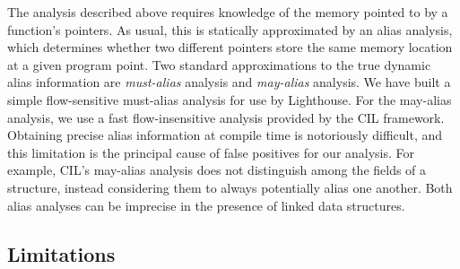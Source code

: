 The analysis described above requires knowledge of the memory pointed to by
a function's pointers.  
%
As usual, this is statically approximated by an alias analysis, which
determines whether two different pointers store the same memory location at
a given program point.  
%
Two standard approximations to the true dynamic alias information are {\em
must-alias} analysis and {\em may-alias} analysis.
%
We have built a simple flow-sensitive must-alias analysis for use by
Lighthouse.  
%
For the may-alias analysis, we use a fast flow-insensitive analysis provided
by the CIL framework.  
%
Obtaining precise alias information at compile time is notoriously
difficult, and this limitation is the principal cause of false positives for
our analysis.
%
For example, CIL's may-alias analysis does not distinguish among the fields
of a structure, instead considering them to always potentially alias one
another.  
%
Both alias analyses can be imprecise in the presence of linked data
structures.









\subsection{Limitations}



